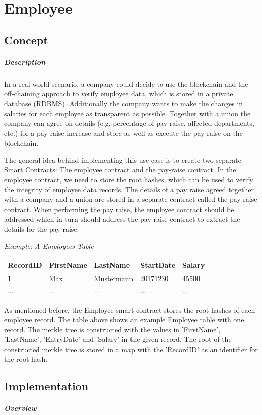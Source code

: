 \section{Employee}
\subsection{Concept}
\subparagraph{Description}
In a real world scenario, a company could decide to use the blockchain and the off-chaining approach to verify employee data, which is stored in a private database (RDBMS). Additionally the company wants to make the changes in salaries for each employee as transparent as possible. Together with a union the company can agree on details (e.g. percentage of pay raise, affected departments, etc.) for a pay raise increase and store as well as execute the pay raise on the blockchain.

The general idea behind implementing this use case is to create two separate Smart Contracts: The employee contract and the pay-raise contract. In the employee contract, we need to store the root hashes, which can be used to verify the integrity of employee data records. The details of a pay raise agreed together with a company and a union are stored in a separate contract called the pay raise contract. When performing the pay raise, the employee contract should be addressed which in turn should address the pay raise contract to extract the details for the pay raise.


\textit{Example: A Employees Table}
\begin{center}
    \begin{tabular}{| l | l | l | l | l |}
    \hline
    RecordID & FirstName & LastName & StartDate & Salary \\ \hline
    1 & Max & Mustermann & 20171230 & 45500 \\ \hline
    ... & ... & ... & ... & ... \\ \hline
    \end{tabular}
\end{center}

As mentioned before, the Employee smart contract stores the root hashes of each employee record. The table above shows an example Employee table with one record. The merkle tree is constructed with the values in 'FirstName', 'LastName', 'EntryDate' and 'Salary' in the given record. The root of the constructed merkle tree is stored in a map with the 'RecordID' as an identifier for the root hash.

\subsection{Implementation}
\subparagraph{Overview}

